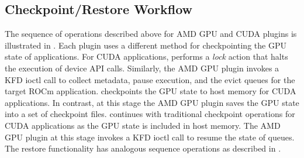 \subsection{Checkpoint/Restore Workflow}
The sequence of operations described above for AMD GPU and CUDA plugins is illustrated in . Each plugin uses a different method for checkpointing the GPU state of applications. For CUDA applications,  performs a \textit{lock} action that halts the execution of device API calls. Similarly, the AMD GPU plugin invokes a KFD ioctl call to collect metadata, pause execution, and the evict queues for the target ROCm application.  checkpoints the GPU state to host memory for CUDA applications. In contrast, at this stage the AMD GPU plugin saves the GPU state into a set of checkpoint files.  continues with traditional checkpoint operations for CUDA applications as the GPU state is included in host memory. The AMD GPU plugin at this stage invokes a KFD ioctl call to resume the state of queues. The restore functionality has analogous sequence operations as described in .